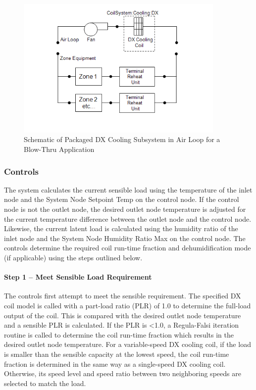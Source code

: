 \begin{figure}[hbtp] %
\centering
\includegraphics[width=0.9\textwidth, height=0.9\textheight, keepaspectratio=true]{media/image5198.png}
\caption{Schematic of Packaged DX Cooling Subsystem in Air Loop for a Blow-Thru Application \protect \label{fig:schematic-of-packaged-dx-cooling-subsystem-in}}
\end{figure}

\subsubsection{Controls}\label{controls-1}

The system calculates the current sensible load using the temperature of the inlet node and the System Node Setpoint Temp on the control node. If the control node is not the outlet node, the desired outlet node temperature is adjusted for the current temperature difference between the outlet node and the control node. Likewise, the current latent load is calculated using the humidity ratio of the inlet node and the System Node Humidity Ratio Max on the control node. The controls determine the required coil run-time fraction and dehumidification mode (if applicable) using the steps outlined below.

\paragraph{Step 1 -- Meet Sensible Load Requirement}\label{step-1-meet-sensible-load-requirement-1}

The controls first attempt to meet the sensible requirement. The specified DX coil model is called with a part-load ratio (PLR) of 1.0 to determine the full-load output of the coil. This is compared with the desired outlet node temperature and a sensible PLR is calculated. If the PLR is \textless{}1.0, a Regula-Falsi iteration routine is called to determine the coil run-time fraction which results in the desired outlet node temperature. For a variable-speed DX cooling coil, if the load is smaller than the sensible capacity at the lowest speed, the coil run-time fraction is determined in the same way as a single-speed DX cooling coil. Otherwise, its speed level and speed ratio between two neighboring speeds are selected to match the load.

